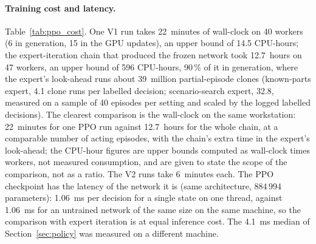 \documentclass[11pt,a4paper]{article}
\theoremstyle{plain}
\theoremstyle{definition}
\theoremstyle{remark}
\newcommand{\nj}{\textsc{nj}}
\begin{document}
\paragraph{Training cost and latency.}
Table~\ref{tab:ppo_cost}. One V1 run takes 22~minutes of wall-clock on 40 workers (6
in generation, 15 in the GPU updates), an upper bound of 14.5 CPU-hours; the
expert-iteration chain that produced the frozen network took 12.7~hours on 47 workers,
an upper bound of 596 CPU-hours, 90\,\% of it in generation, where the expert's
look-ahead runs about 39~million partial-episode clones (known-parts expert, 4.1 clone
runs per labelled decision; scenario-search expert, 32.8, measured on a sample of 40
episodes per setting and scaled by the logged labelled decisions). The clearest
comparison is the wall-clock on the same workstation: 22~minutes for one PPO run against
12.7~hours for the whole chain, at a comparable number of acting episodes, with the
chain's extra time in the expert's look-ahead; the CPU-hour figures are upper bounds
computed as wall-clock times workers, not measured consumption, and are given to state
the scope of the comparison, not as a ratio. The V2 runs take 6~minutes each. The PPO checkpoint has the latency of the network it is (same
architecture, 884\,994 parameters): 1.06~ms per decision for a single state on one
thread, against 1.06~ms for an untrained network of the same size on the same machine,
so the comparison with expert iteration is at equal inference cost. The 4.1~ms median of Section~\ref{sec:policy} was measured on a different machine.

\begin{table}[t]
\centering
\caption{Training cost of the PPO baseline and of the expert-iteration chain
(\texttt{rl2\_gen\_s\_big} to \texttt{rl2\_gen\_s\_b}) on the same workstation. CPU-h is the
upper bound wall-clock $\times$ workers; the GPU column is the time in the policy
updates; the look-ahead clone runs of the chain are estimated from the logged labelled
decisions and a measured sample (partial episodes, not full ones). Best score = greedy
validation score vs \nj\ [\%].}
\label{tab:ppo_cost}
\resizebox{\linewidth}{!}{}
\end{table}
\end{document}

